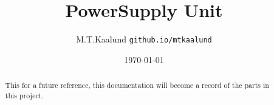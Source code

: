 \documentclass[11pt,a4paper,twoside]{article}
\begin{document}
\title{PowerSupply Unit}
\author{M.T.Kaalund \texttt{github.io/mtkaalund}}
\date{\today}

\maketitle

\begin{abstract}
This for a future reference, this documentation will become a record of the parts in this project.
\end{abstract}

\tableofcontents







\end{document}

